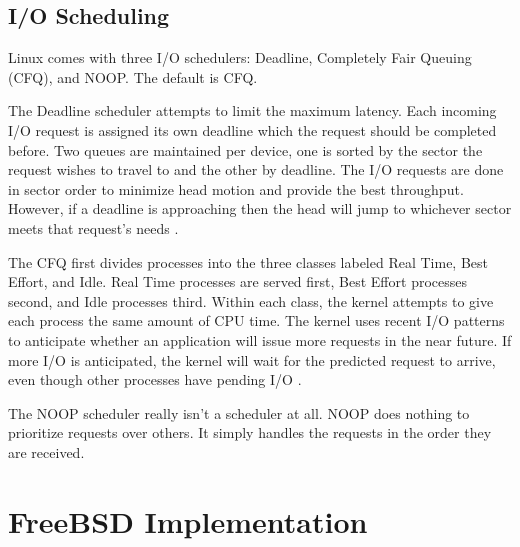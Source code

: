 \documentclass[onecolumn,draftclsnofoot, 10pt, compsoc]{IEEEtran}
\begin{document}
		\subsection{I/O Scheduling}
			Linux comes with three I/O schedulers: Deadline, Completely Fair Queuing (CFQ), and NOOP. The default is CFQ.
			
			The Deadline scheduler attempts to limit the maximum latency. 
			Each incoming I/O request is assigned its own deadline which the request should be completed before.
			Two queues are maintained per device, one is sorted by the sector the request wishes to travel to and the other by deadline. 
			The I/O requests are done in sector order to minimize head motion and provide the best throughput. However, if a deadline is approaching then the head will jump to whichever sector meets that request's needs \cite{linuxSChed}.
			
			The CFQ first divides processes into the three classes labeled Real Time, Best Effort, and Idle. 
			Real Time processes are served first, Best Effort processes second, and Idle processes third. 
			Within each class, the kernel attempts to give each process the same amount of CPU time. 
			The kernel uses recent I/O patterns to anticipate whether an application will issue more requests in the near future.
			If more I/O is anticipated, the kernel will wait for the predicted request to arrive, even though other processes have pending I/O \cite{linuxSChed}.

			The NOOP scheduler really isn't a scheduler at all. 
			NOOP does nothing to prioritize requests over others.
			It simply handles the requests in the order they are received.
	
	\section{FreeBSD Implementation}
	
\end{document}
